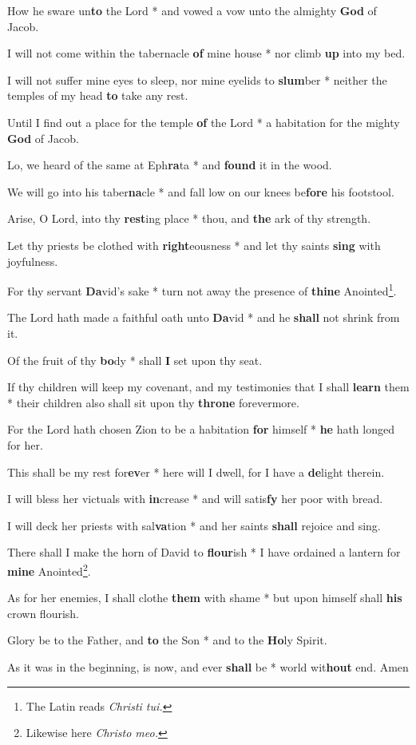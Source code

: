 \begin{multicols}{2}
	How he sware un\textbf{to} the Lord * and vowed a vow unto the almighty \textbf{God} of Jacob.
	
	I will not come within the tabernacle \textbf{of} mine house * nor climb \textbf{up} into my bed.
	
	I will not suffer mine eyes to sleep, nor mine eyelids to \textbf{slum}ber * neither the temples of my head \textbf{to} take any rest.
	
	Until I find out a place for the temple \textbf{of} the Lord * a habitation for the mighty \textbf{God} of Jacob.
	
	Lo, we heard of the same at Eph\textbf{ra}ta * and \textbf{found} it in the wood.
	
	We will go into his taber\textbf{na}cle * and fall low on our knees be\textbf{fore} his footstool.
	
	Arise, O Lord, into thy \textbf{rest}ing place * thou, and \textbf{the} ark of thy strength.
	
	Let thy priests be clothed with \textbf{right}eousness * and let thy saints \textbf{sing} with joyfulness.
	
	For thy servant \textbf{Da}vid's sake * turn not away the presence of \textbf{thine} Anointed\footnote{The Latin reads \textit{Christi tui.}}.
	
	The Lord hath made a faithful oath unto \textbf{Da}vid * and he \textbf{shall} not shrink from it.
	
	Of the fruit of thy \textbf{bo}dy * shall \textbf{I} set upon thy seat.
	
	If thy children will keep my covenant, and my testimonies that I shall \textbf{learn} them * their children also shall sit upon thy \textbf{throne} forevermore.
	
	For the Lord hath chosen Zion to be a habitation \textbf{for} himself * \textbf{he} hath longed for her.
	
	This shall be my rest for\textbf{ev}er * here will I dwell, for I have a \textbf{de}light therein.
	
	I will bless her victuals with \textbf{in}crease * and will satis\textbf{fy} her poor with bread.
	
	I will deck her priests with sal\textbf{va}tion * and her saints \textbf{shall} rejoice and sing.
	
	There shall I make the horn of David to \textbf{flour}ish * I have ordained a lantern for \textbf{mine} Anointed\footnote{Likewise here \textit{Christo meo.}}.
	
	As for her enemies, I shall clothe \textbf{them} with shame * but upon himself shall \textbf{his} crown flourish.
	
	Glory be to the Father, and \textbf{to} the Son * and to the \textbf{Ho}ly Spirit.
	
	As it was in the beginning, is now, and ever \textbf{shall} be * world wit\textbf{hout} end. Amen
\end{multicols}